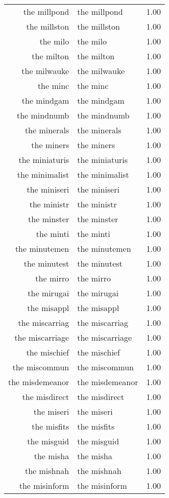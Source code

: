 \begin{table}[ht]
\begin{tabular}{rlr}
  the millpond & the millpond & 1.00 \\ 
  the millston & the millston & 1.00 \\ 
  the milo & the milo & 1.00 \\ 
  the milton & the milton & 1.00 \\ 
  the milwauke & the milwauke & 1.00 \\ 
  the minc & the minc & 1.00 \\ 
  the mindgam & the mindgam & 1.00 \\ 
  the mindnumb & the mindnumb & 1.00 \\ 
  the minerals & the minerals & 1.00 \\ 
  the miners & the miners & 1.00 \\ 
  the miniaturis & the miniaturis & 1.00 \\ 
  the minimalist & the minimalist & 1.00 \\ 
  the miniseri & the miniseri & 1.00 \\ 
  the ministr & the ministr & 1.00 \\ 
  the minster & the minster & 1.00 \\ 
  the minti & the minti & 1.00 \\ 
  the minutemen & the minutemen & 1.00 \\ 
  the minutest & the minutest & 1.00 \\ 
  the mirro & the mirro & 1.00 \\ 
  the mirugai & the mirugai & 1.00 \\ 
  the misappl & the misappl & 1.00 \\ 
  the miscarriag & the miscarriag & 1.00 \\ 
  the miscarriage & the miscarriage & 1.00 \\ 
  the mischief & the mischief & 1.00 \\ 
  the miscommun & the miscommun & 1.00 \\ 
  the misdemeanor & the misdemeanor & 1.00 \\ 
  the misdirect & the misdirect & 1.00 \\ 
  the miseri & the miseri & 1.00 \\ 
  the misfits & the misfits & 1.00 \\ 
  the misguid & the misguid & 1.00 \\ 
  the misha & the misha & 1.00 \\ 
  the mishnah & the mishnah & 1.00 \\ 
  the misinform & the misinform & 1.00 \\ 

\end{tabular}
\end{table}
